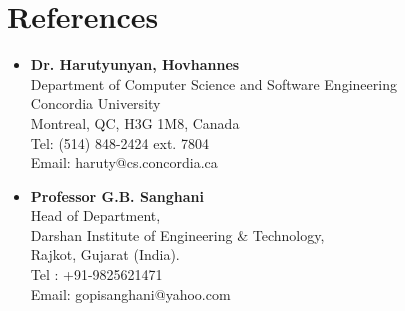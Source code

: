 \documentclass[12pt,a4paper,sans]{moderncv} %
\begin{document}

\section{References}
\begin{itemize}
\item \textbf{Dr. Harutyunyan, Hovhannes}\\
Department of Computer Science and Software Engineering\\
Concordia University\\
Montreal, QC, H3G 1M8, Canada\\
Tel: (514) 848-2424 ext. 7804\\
Email: haruty@cs.concordia.ca\\
\item \textbf{Professor G.B. Sanghani}\\
Head of Department,\\
Darshan Institute of Engineering \& Technology,\\
Rajkot, Gujarat (India).\\
Tel : +91-9825621471\\
Email: gopisanghani@yahoo.com
\end{itemize}
\end{document}
